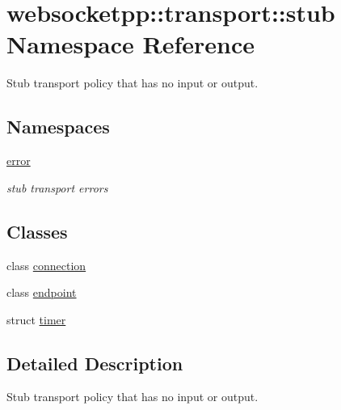 \hypertarget{namespacewebsocketpp_1_1transport_1_1stub}{}\section{websocketpp\+:\+:transport\+:\+:stub Namespace Reference}
\label{namespacewebsocketpp_1_1transport_1_1stub}


Stub transport policy that has no input or output.  


\subsection*{Namespaces}
\begin{DoxyCompactItemize}
\item 
 \mbox{\hyperlink{namespacewebsocketpp_1_1transport_1_1stub_1_1error}{error}}
\begin{DoxyCompactList}\small\item\em stub transport errors \end{DoxyCompactList}\end{DoxyCompactItemize}
\subsection*{Classes}
\begin{DoxyCompactItemize}
\item 
class \mbox{\hyperlink{classwebsocketpp_1_1transport_1_1stub_1_1connection}{connection}}
\item 
class \mbox{\hyperlink{classwebsocketpp_1_1transport_1_1stub_1_1endpoint}{endpoint}}
\item 
struct \mbox{\hyperlink{structwebsocketpp_1_1transport_1_1stub_1_1timer}{timer}}
\end{DoxyCompactItemize}


\subsection{Detailed Description}
Stub transport policy that has no input or output. 